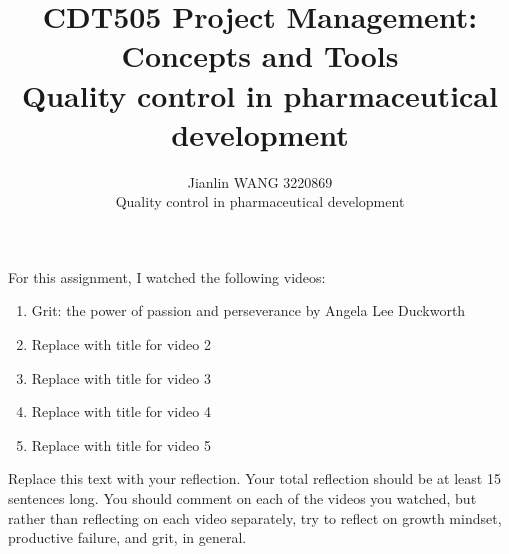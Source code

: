 \documentclass[12pt]{article}
\begin{document}
 
 
\title{CDT505 Project Management: Concepts and Tools\\
Quality control in pharmaceutical development}
\author{Jianlin WANG 3220869\\ %
Quality control in pharmaceutical development\\
}

\maketitle

\noindent For this assignment, I watched the following videos:

\begin{enumerate} %
\item Grit: the power of passion and perseverance by Angela Lee Duckworth  
\item Replace with title for video 2
\item Replace with title for video 3
\item Replace with title for video 4
\item Replace with title for video 5
\end{enumerate}

Replace this text with your reflection.  Your total reflection should be at least 15 sentences long. You should comment on each of the videos you watched, but rather than reflecting on each video separately, try to reflect on growth mindset, productive failure, and grit, in general.
 
 
\end{document}
